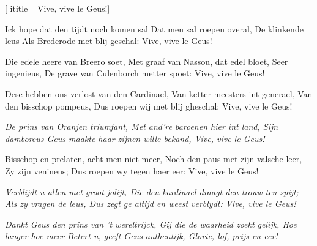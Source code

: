 [
ititle= {Vive, vive le Geus!}]


\beginverse
Ick hope dat den tijdt noch komen sal
Dat men sal roepen overal,
De klinkende leus
Als Brederode met blij geschal:
Vive, vive le Geus!
\endverse

\beginverse
Die edele heere van Breero soet,
Met graaf van Nassou, dat edel bloet,
Seer ingenieus,
De grave van Culenborch metter spoet:
Vive, vive le Geus!
\endverse

\beginverse
Dese hebben ons verlost van den Cardinael,
Van ketter meesters int generael,
Van den bisschop pompeus,
Dus roepen wij met blij gheschal:
Vive, vive le Geus!
\endverse

\beginverse
\textit {De prins van Oranjen triumfant,
Met and're baroenen hier int land,
Sijn damboreus
Geus maakte haar zijnen wille bekand,
Vive, vive le Geus!}
\endverse

\beginverse
Bisschop en  prelaten, acht men niet meer,
Noch den paus met zijn valsche leer,
Zy zijn venineus;
Dus roepen wy tegen haer eer:
Vive, vive le Geus!
\endverse

\beginverse
\textit {Verblijdt u allen met groot jolijt,
Die den kardinael draagt den trouw ten spijt;
Als zy vragen de leus,
Dus zegt ge altijd en weest verblydt:
Vive, vive le Geus!}
\endverse

\beginverse
\textit {Dankt Geus den prins van 't wereltrijck,
Gij die de waarheid zoekt gelijk,
Hoe langer hoe meer
Betert u, geeft Geus authentijk,
Glorie, lof, prijs en eer!}
\endverse

\endsong